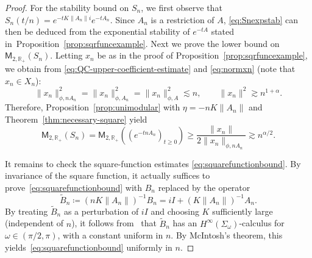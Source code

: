 \documentclass[11pt]{amsart}
\theoremstyle{definition}
\theoremstyle{remark}
\numberwithin{equation}{section}
\newcommand{\R}{\mathbb R}
\newcommand{\1}{\mathbf 1}
\newcommand{\cM}{\mathsf{M}}
\newcommand{\norm}[1]{\lVert #1\rVert}
\newcommand{\wt}{\widetilde}
\begin{document}
\begin{proof}
For the stability bound on $S_n$, we first observe that $S_n(t / n) = e^{-t K \norm{A_n} i} e^{-t A_n}$.
Since $A_n$ is a restriction of $A$, \eqref{eq:Snexpstab} can then be deduced from the exponential stability of $e^{-tA}$ stated in~Proposition~\ref{prop:sqrfuncexample}.
Next we prove the lower bound on $\cM_{2,\R_+}(S_n)$.
Letting $x_n$ be as in the proof of Proposition~\ref{prop:sqrfuncexample}, we obtain from \eqref{eq:QC-upper-coefficient-estimate} and \eqref{eq:normxn} (note that $x_n \in X_n$):
\begin{equation*}
  \norm{x_n}_{\phi,nA_n}^2 
  = \norm{x_n}_{\phi,A_n}^2
  =\norm{x_n}_{\phi,A}^2\lesssim n, \qquad  \norm{x_n}^2\gtrsim n^{1+\alpha}.
\end{equation*}
Therefore, Proposition~\ref{prop:unimodular} with $\eta = -n K \norm{A_n}$ and Theorem~\ref{thm:necessary-square} yield
\begin{equation*}
 \cM_{2,\R_+}(S_n) = \cM_{2,\R_+}((e^{-t nA_n})_{t \geq 0})
 \ge\frac{\norm{x_n}}{2\norm{x_n}_{\phi,nA_n}}
 \gtrsim n^{\alpha/2}.
\end{equation*}


It remains to check the square-function estimates \eqref{eq:squarefunctionbound}.
By invariance of the square function, it actually suffices to prove~\eqref{eq:squarefunctionbound}
with $B_n$ replaced by the operator
\begin{equation}
    \wt{B}_n \coloneq (n K\norm{A_n})^{-1} B_n = iI + (K\norm{A_n})^{-1}A_n.
\end{equation}
By treating $\wt{B}_n$ as a perturbation of $iI$ and choosing $K$ sufficiently large (independent of $n$), it follows from~\cite[Theorem 16.2.8]{HNVW23}
that $\wt{B}_n$ has an $H^{\infty}(\Sigma_{\omega})$-calculus for $\omega \in (\pi/2,\pi)$, with a constant uniform in $n$.
By McIntosh's theorem, this yields~\eqref{eq:squarefunctionbound} uniformly in $n$.


\end{proof}
\end{document}
